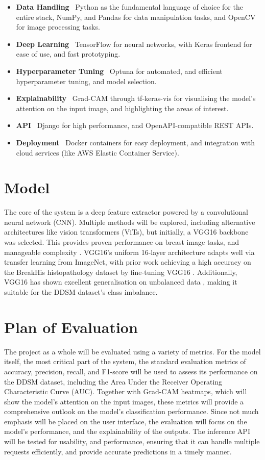 \documentclass[../main]{subfiles}
\begin{document}
\begin{itemize}
	\item \textbf{Data Handling} \textemdash\ Python as the fundamental language of choice for the entire stack, NumPy, and Pandas for data manipulation tasks, and OpenCV for image processing tasks.
	\item \textbf{Deep Learning} \textemdash\ TensorFlow for neural networks, with Keras frontend for ease of use, and fast prototyping.
	\item \textbf{Hyperparameter Tuning} \textemdash\ Optuna for automated, and efficient hyperparameter tuning, and model selection.
	\item \textbf{Explainability} \textemdash\ Grad-CAM through tf-keras-vis for visualising the model's attention on the input image, and highlighting the areas of interest.
	\item \textbf{API} \textemdash\ Django for high performance, and OpenAPI-compatible REST APIs.
	\item \textbf{Deployment} \textemdash\ Docker containers for easy deployment, and integration with cloud services (like AWS Elastic Container Service).
\end{itemize}

\section{Model}
The core of the system is a deep feature extractor powered by a convolutional neural network (CNN). Multiple methods will be explored, including alternative architectures like vision transformers (ViTs), but initially, a VGG16 backbone was selected. This provides proven performance on breast image tasks, and manageable complexity \autocite{fatima2025application}. VGG16's uniform 16-layer architecture adapts well via transfer learning from ImageNet, with prior work achieving a high accuracy on the BreakHis histopathology dataset by fine-tuning VGG16 \autocite{fatima2025application}. Additionally, VGG16 has shown excellent generalisation on unbalanced data \autocite{fatima2025application}, making it suitable for the DDSM dataset's class imbalance.

\section{Plan of Evaluation}
The project as a whole will be evaluated using a variety of metrics. For the model itself, the most critical part of the system, the standard evaluation metrics of accuracy, precision, recall, and F1-score will be used to assess its performance on the DDSM dataset, including the Area Under the Receiver Operating Characteristic Curve (AUC). Together with Grad-CAM heatmaps, which will show the model's attention on the input images, these metrics will provide a comprehensive outlook on the model's classification performance. Since not much emphasis will be placed on the user interface, the evaluation will focus on the model's performance, and the explainability of the outputs. The inference API will be tested for usability, and performance, ensuring that it can handle multiple requests efficiently, and provide accurate predictions in a timely manner.
\end{document}
